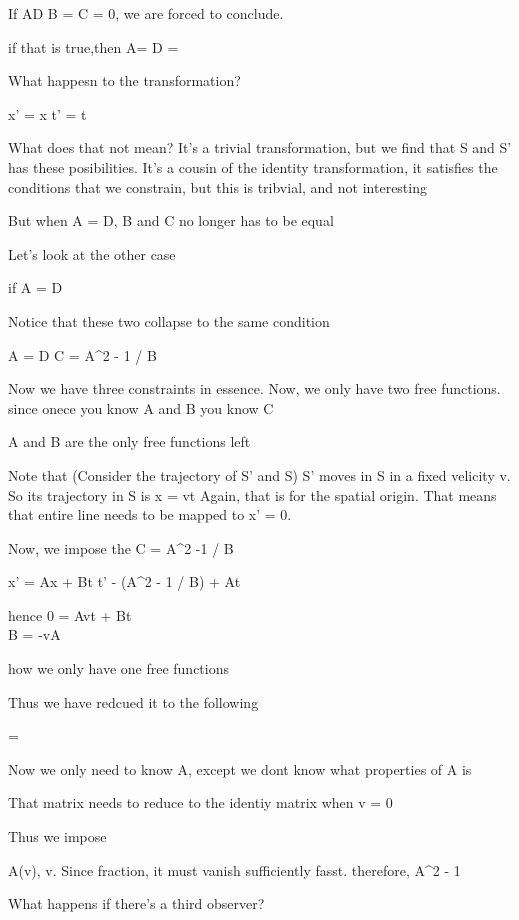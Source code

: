 If A\neq D \implies B = C = 0, we are forced to conclude.

if that is true,then
A=
D =

What happesn to the transformation?

x' = \pm x 
t' = \mp t

What does that not mean? It's a trivial transformation, but we find that S and S' has these posibilities.
It's a cousin of the identity transformation, it satisfies the conditions that we constrain, but this is tribvial, and not interesting

But when A = D, B and C no longer has to be equal

Let's look at the other case

if A = D

Notice that these two collapse to the same condition

A = D \implies C = A^2 - 1  / B

Now we have three constraints in essence. Now, we only have two free functions. since onece you know A and B you know C

A and B are the only free functions left 

Note that (Consider the trajectory of S' and S) S' moves in S in a fixed velicity v. So its trajectory in S is x = vt
Again, that is for the spatial origin. That means that entire line needs to be mapped to x' = 0.

Now, we impose the C = A^2 -1 / B

x' = Ax + Bt
t' - (A^2 - 1 / B) + At

hence
0 = Avt + Bt \\
B = -vA

how we only have one free functions

Thus we have redcued it to the following

 =

Now we only need to know A, except we dont know what properties of A is

That matrix needs to reduce to the identiy matrix when v = 0

Thus we impose

A(v), v. Since fraction, it must vanish sufficiently fasst.
therefore, A^2 - 1 \approx {}

What happens if there's a third observer?

